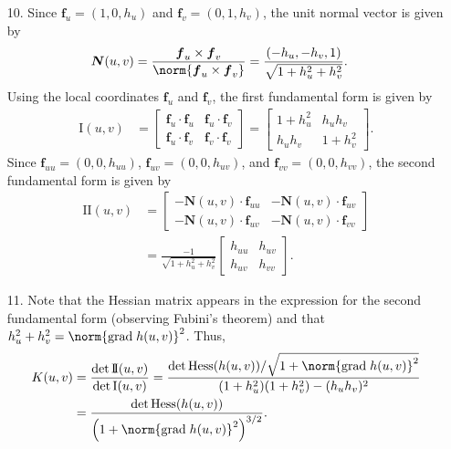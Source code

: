 \documentclass[a4paper,12pt]{article}
\newcommand{\bs}{\boldsymbol}
\theoremstyle{remark}
\begin{document}
\begin{enumerate}
    \item[10.]
        Since $\bs{f}_u = (1, 0, h_u)$ and $\bs{f}_v = (0, 1, h_v)$, the unit normal vector is given by
        \begin{align*}
            \bs{N}(u, v) &= \frac{\bs{f}_u \times \bs{f}_v}{\norm{\bs{f}_u \times \bs{f}_v}} = \frac{(-h_u, -h_v, 1)}{\sqrt{1 + h_u^2 + h_v^2}}.
        \end{align*}
        Using the local coordinates $\bs{f}_u$ and $\bs{f}_v$, the first fundamental form is given by
        \begin{align*}
            \mathrm{I}(u, v) &= \left[ \begin{array}{cc}
                    \bs{f}_u \cdot \bs{f}_u & \bs{f}_u \cdot \bs{f}_v \\
                    \bs{f}_u \cdot \bs{f}_v & \bs{f}_v \cdot \bs{f}_v
            \end{array} \right]
            = \left[ \begin{array}{cc}
                    1 + h_u^2 & h_u h_v \\
                    h_u h_v & 1 + h_v^2
            \end{array} \right].
        \end{align*}
        Since $\bs{f}_{uu} = (0, 0, h_{uu})$, $\bs{f}_{uv} = (0, 0, h_{uv})$, and $\bs{f}_{vv} = (0, 0, h_{vv})$, the second fundamental form is given by
        \begin{align*}
            \mathrm{I\!I}(u, v) &= \left[ \begin{array}{cc}
                    -\bs{N}(u, v) \cdot \bs{f}_{uu} & -\bs{N}(u, v) \cdot \bs{f}_{uv} \\
                    -\bs{N}(u, v) \cdot \bs{f}_{uv} & -\bs{N}(u, v) \cdot \bs{f}_{vv}
            \end{array} \right] \\
            &= \frac{-1}{\sqrt{1 + h_u^2 + h_v^2}} \left[ \begin{array}{cc}
                    h_{uu} & h_{uv} \\
                    h_{uv} & h_{vv}
            \end{array} \right].
        \end{align*}

    \item[11.]
        Note that the Hessian matrix appears in the expression for the second fundamental form (observing Fubini's theorem) and that $h_u^2 + h_v^2 = \norm{\mathrm{grad}\;h(u, v)}^2$. Thus,
        \begin{align*}
            K(u, v) &= \frac{\det \mathrm{I\!I}(u, v)}{\det \mathrm{I}(u, v)} = \frac{\det \mathrm{Hess}(h(u, v)) / \sqrt{1 + \norm{\mathrm{grad}\;h(u, v)}^2}}{(1 + h_u^2)(1 + h_v^2) - (h_u h_v)^2} \\
            &= \frac{\det \mathrm{Hess}(h(u, v))}{\left( 1 + \norm{\mathrm{grad}\;h(u, v)}^2 \right)^{3/2}}.
        \end{align*}
\end{enumerate}
\end{document}
